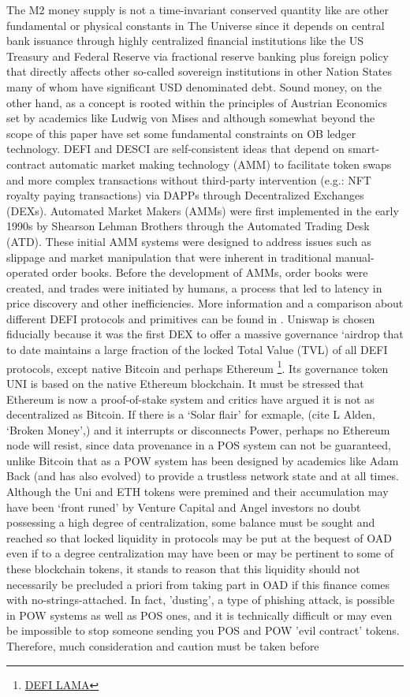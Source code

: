 \documentclass[final,5p,times,twocolumn,authoryear]{elsarticle}
\begin{document}
The M2 money supply is not a time-invariant conserved quantity like are other fundamental or physical constants in The Universe since it depends on central bank issuance through highly centralized financial institutions like the US Treasury and Federal Reserve via fractional reserve banking plus foreign policy that directly affects other so-called sovereign institutions in other Nation States many of whom have significant USD denominated debt. Sound money, on the other hand, as a concept is rooted within the principles of Austrian Economics set by academics like Ludwig von Mises  \cite{Hansen2020Book} and although somewhat beyond the scope of this paper have set some fundamental constraints on OB ledger technology. 
DEFI and DESCI are self-consistent ideas that depend on smart-contract automatic market making technology (AMM) to facilitate token swaps and more complex transactions without third-party intervention (e.g.: NFT royalty paying transactions) via DAPPs through Decentralized Exchanges (DEXs). Automated Market Makers (AMMs) were first implemented in the early 1990s by Shearson Lehman Brothers through the Automated Trading Desk (ATD). These initial AMM systems were designed to address issues such as slippage and market manipulation that were inherent in traditional manual-operated order books. Before the development of AMMs, order books were created, and trades were initiated by humans, a process that led to latency in price discovery and other inefficiencies. More information and a comparison about different DEFI protocols and primitives can be found in \cite{2023arXiv230805282J}. Uniswap is chosen fiducially because it was the first DEX to offer a massive governance `airdrop that to date maintains a large fraction of the locked Total Value (TVL) of all DEFI protocols, except native Bitcoin and perhaps Ethereum \footnote{\href{https://defillama.com/protocols/dexes}{DEFI LAMA}}. Its governance token UNI is based on the native Ethereum blockchain. It must be stressed that Ethereum is now a proof-of-stake system and critics have argued it is not as decentralized as Bitcoin. If there is a `Solar flair' for exmaple, (cite L Alden, `Broken Money',) and it interrupts or disconnects Power, perhaps no Ethereum node will resist, since data provenance in a POS system can not be guaranteed, unlike Bitcoin that as a POW system has been designed by academics like Adam Back (and has also evolved) to provide a trustless network state and at all times. Although the Uni and ETH tokens were premined and their accumulation may have been `front runed' by Venture Capital and Angel investors no doubt possessing a high degree of centralization, some balance must be sought and reached so that locked liquidity in protocols may be put at the bequest of OAD even if to a degree centralization may have been or may be pertinent to some of these blockchain tokens, it stands to reason that this liquidity should not necessarily be precluded a priori from taking part in OAD if this finance comes with no-strings-attached. In fact, 'dusting', a type of phishing attack, is possible in POW systems as well as POS ones, and it is technically difficult or may even be impossible to stop someone sending you POS and POW 'evil contract' tokens. Therefore, much consideration and caution must be taken before 
\end{document}
